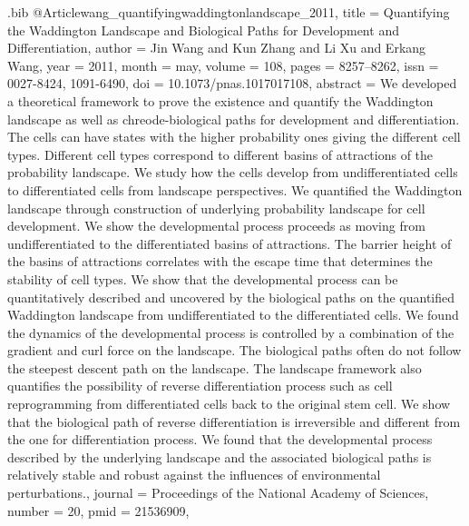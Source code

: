 \documentclass[
  table,
  10pt,
  a4paper]{article}
\begin{document}
\begin{filecontents}{\jobname.bib}
@Article{wang_quantifyingwaddingtonlandscape_2011,
	title = {Quantifying the {{Waddington Landscape}} and {{Biological Paths}} for {{Development}} and {{Differentiation}}},
	author = {Jin Wang and Kun Zhang and Li Xu and Erkang Wang},
	year = {2011},
	month = {may},
	volume = {108},
	pages = {8257--8262},
	issn = {0027-8424, 1091-6490},
	doi = {10.1073/pnas.1017017108},
	abstract = {We developed a theoretical framework to prove the existence and quantify the Waddington landscape as well as chreode-biological paths for development and differentiation. The cells can have states with the higher probability ones giving the different cell types. Different cell types correspond to different basins of attractions of the probability landscape. We study how the cells develop from undifferentiated cells to differentiated cells from landscape perspectives. We quantified the Waddington landscape through construction of underlying probability landscape for cell development. We show the developmental process proceeds as moving from undifferentiated to the differentiated basins of attractions. The barrier height of the basins of attractions correlates with the escape time that determines the stability of cell types. We show that the developmental process can be quantitatively described and uncovered by the biological paths on the quantified Waddington landscape from undifferentiated to the differentiated cells. We found the dynamics of the developmental process is controlled by a combination of the gradient and curl force on the landscape. The biological paths often do not follow the steepest descent path on the landscape. The landscape framework also quantifies the possibility of reverse differentiation process such as cell reprogramming from differentiated cells back to the original stem cell. We show that the biological path of reverse differentiation is irreversible and different from the one for differentiation process. We found that the developmental process described by the underlying landscape and the associated biological paths is relatively stable and robust against the influences of environmental perturbations.},
	journal = {Proceedings of the National Academy of Sciences},
	number = {20},
	pmid = {21536909},
}


\end{filecontents}
\end{document}

